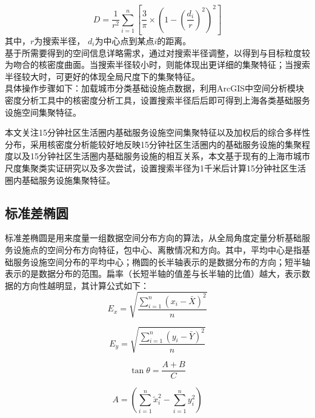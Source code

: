 \documentclass{shnuthesis}
\begin{document}
\begin{equation}
	D=\frac{1}{r^{2}} \sum_{i=1}^{n}\left[\frac{3}{\pi} \times\left(1-\left(\frac{d_{i}}{r}\right)^{2}\right)^{2}\right]
\end{equation}
\newline
其中，$r$为搜索半径， $d_i$为中心点到某点$i$的距离。\\
\indent 基于所需要得到的空间信息详略需求，通过对搜索半径调整，以得到与目标粒度较为吻合的核密度曲面\textsuperscript{\cite{borruso2008a}}。当搜索半径较小时，则能体现出更详细的集聚特征；当搜索半径较大时，可更好的体现全局尺度下的集聚特征。\\
\indent 具体操作步骤如下：加载城市分类基础设施点数据，利用ArcGIS中空间分析模块密度分析工具中的核密度分析工具，设置搜索半径后后即可得到上海各类基础服务设施空间集聚特征。

本文关注15分钟社区生活圈内基础服务设施空间集聚特征以及加权后的综合多样性分布，采用核密度分析能较好地反映15分钟社区生活圈内的基础服务设施的集聚程度以及15分钟社区生活圈内基础服务设施的相互关系，本文基于现有的上海市城市尺度集聚类实证研究\textsuperscript{\cite{saqib2019}}以及多次尝试，设置搜索半径为1千米后计算15分钟社区生活圈内基础服务设施集聚特征。

\subsection{标准差椭圆}

标准差椭圆是用来度量一组数据空间分布方向的算法，从全局角度定量分析基础服务设施点的空间分布方向特征，包中心、离散情况和方向\textsuperscript{\cite{lefever1926}}。其中，平均中心是指基础服务设施空间分布的平均中心；椭圆的长半轴表示的是数据分布的方向；短半轴表示的是数据分布的范围。扁率（长短半轴的值差与长半轴的比值）越大，表示数据的方向性越明显，其计算公式如下：
\begin{equation}
	E_{x}=\sqrt{\frac{\sum_{i=1}^{n}\left(x_{i}-\bar{X}\right)^{2}}{n}}
\end{equation}

\begin{equation}
	E_{y}=\sqrt{\frac{\sum_{i=1}^{n}\left(y_{i}-\bar{Y}\right)^{2}}{n}}
\end{equation}

\begin{equation}
	\tan \theta=\frac{A+B}{C}
\end{equation}

\begin{equation}
	A=\left(\sum_{i=1}^{n} \tilde{x}_{i}^{2}-\sum_{i=1}^{n} y_{i}^{2}\right)
\end{equation}
\end{document}
